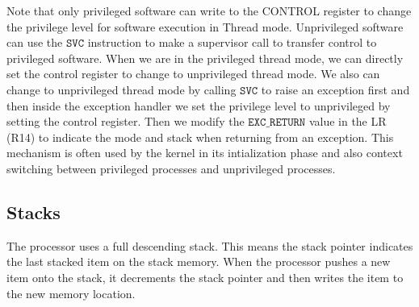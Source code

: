Note that only privileged software can write to the CONTROL register to change the privilege level for software execution in Thread mode. Unprivileged software can use the $\mathtt{SVC}$ instruction to make a supervisor call to transfer control to privileged software. 
When we are in the privileged thread mode, we can directly set the control register to change to unprivileged thread mode. We also can change to unprivileged thread mode by calling $\mathtt{SVC}$ to raise an exception first  and then inside the exception handler we set the privilege level to unprivileged by setting the control register. Then we modify the $\mathtt{EXC\_RETURN}$ value in the LR (R14) to indicate the mode and stack when returning from an exception. This mechanism is often used by the kernel in its intialization phase and also context switching between privileged processes and unprivileged processes.
\subsection{Stacks}
\label{sec_stacks}
The processor uses a full descending stack. This means the stack pointer indicates the last stacked item on the stack memory. When the processor pushes a new item onto the stack, it decrements the stack pointer and then writes the item to the new memory location. 

